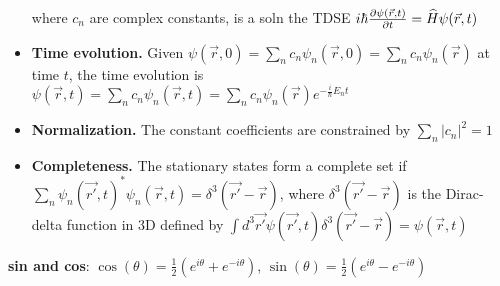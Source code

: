 \begin{itemize}[noitemsep,wide=0pt, leftmargin=\dimexpr{} + 2\relax]
            \vspace{-5px}
        
            where $c_n$ are complex constants, is a soln the TDSE 
        $i \hbar \pdv{\psi(\vec{r}, t)}{t} = \widehat{H} \psi(\vec{r}, t)$

    \item \textbf{Time evolution.}
        Given $\psi(\vec{r}, 0) = \sum_n c_n \psi_n(\vec{r}, 0) = \sum_n c_n \psi_n (\vec{r})$
        at time $t$, the time evolution is 
        $\psi(\vec{r}, t) = \sum_n c_n \psi_n(\vec{r}, t) = \sum_n c_n \psi_n(\vec{r}) e^{-\frac{i}{\hbar} E_n t}$


    \item \textbf{Normalization.}
        The constant coefficients are constrained by $\sum_n |c_n|^2 = 1$

    \item \textbf{Completeness.}
        The stationary states form a complete set if $\sum_n \psi_n (\vec{r'}, t)^* \psi_{n} (\vec{r}, t) = \delta^3 (\vec{r'} - \vec{r})$, where $\delta^3(\vec{r'} - \vec{r})$ is the Dirac-delta function in 3D defined by $\int d^3 \vec{r'} \psi(\vec{r'}, t) \delta^3(\vec{r'} - \vec{r}) = \psi(\vec{r}, t)$
\end{itemize}

\vspace{-10pt}

\textbf{sin and cos}: $\cos(\theta) = \frac{1}{2}(e^{i \theta} + e^{-i \theta})$, $\sin(\theta) = \frac{1}{2}(e^{i \theta} - e^{-i \theta})$ \\



